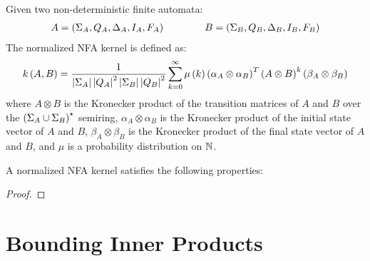 \documentclass[12pt]{article}
\begin{document}
\begin{definition}
  Given two non-deterministic finite automata:
  \begin{align*}
    A = \left(\Sigma_A, Q_A, \Delta_A, I_A, F_A\right)
    \qquad \qquad
    B = \left(\Sigma_B, Q_B, \Delta_B, I_B, F_B\right)
  \end{align*}
  The normalized NFA kernel is defined as:
  \begin{align*}
  k\left(A, B\right)
    = \frac{1}{\left\lvert\Sigma_A\right\rvert \left\lvert Q_A\right\rvert^2 \left\lvert\Sigma_B\right\rvert \left\lvert Q_B\right\rvert^2}
        \sum_{k = 0}^{\infty}
          \mu\left(k\right)
          \left(\alpha_A \otimes \alpha_B\right)^T
            \left(A \otimes B\right)^k
            \left(\beta_A \otimes \beta_B\right)
  \end{align*}
  where
  \(A \otimes B\) is the Kronecker product of the transition matrices
  of \(A\) and \(B\) over the
  \(\left(\Sigma_A \cup \Sigma_B\right)^\star\) semiring,
  \(\alpha_A \otimes \alpha_B\) is the Kronecker product of the initial
  state vector of \(A\) and \(B\),
  \(\beta_A \otimes \beta_B\) is the Kronecker product of the final
  state vector of \(A\) and \(B\),
  and \(\mu\) is a probability distribution on \(\mathbb{N}\).
\end{definition}


\begin{theorem}
  A normalized NFA kernel satisfies the following properties:
\end{theorem}
\begin{proof}
\end{proof}



\section{Bounding Inner Products}




\printbibliography
\end{document}
